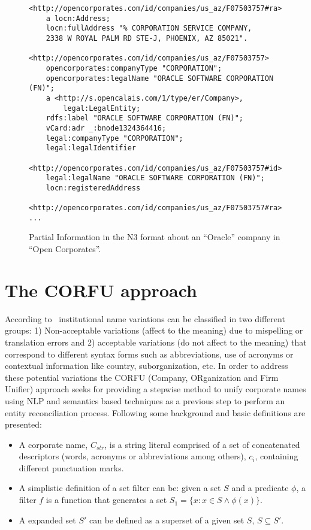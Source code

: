 \documentclass{llncs}
\begin{document}
\begin{itemize}
\begin{figure}[!h]
\begin{center}
\begin{lstlisting}[language=SPARQL]
<http://opencorporates.com/id/companies/us_az/F07503757#ra> 
	a locn:Address;
	locn:fullAddress "% CORPORATION SERVICE COMPANY, 
	2338 W ROYAL PALM RD STE-J, PHOENIX, AZ 85021".

<http://opencorporates.com/id/companies/us_az/F07503757> 
	opencorporates:companyType "CORPORATION";
	opencorporates:legalName "ORACLE SOFTWARE CORPORATION (FN)";
	a <http://s.opencalais.com/1/type/er/Company>,
		legal:LegalEntity;
	rdfs:label "ORACLE SOFTWARE CORPORATION (FN)";
	vCard:adr _:bnode1324364416;
	legal:companyType "CORPORATION";
	legal:legalIdentifier 
	  <http://opencorporates.com/id/companies/us_az/F07503757#id>;
	legal:legalName "ORACLE SOFTWARE CORPORATION (FN)";
	locn:registeredAddress 
	  <http://opencorporates.com/id/companies/us_az/F07503757#ra>.
...
\end{lstlisting}
\caption{Partial Information in the N3 format about an ``Oracle'' company in ``Open Corporates''.}
\label{figure:open}
\end{center}
\end{figure}
 
 
\end{itemize}

% 
 \section{The CORFU approach}
According to~\cite{Galvez2006,Morillo:2013:TAA:2424697.2424727} institutional name variations can be 
classified in two different groups: 1) Non-acceptable variations (affect to the meaning) due to mispelling or translation errors and 
2) acceptable variations (do not affect to the meaning) that correspond to different syntax forms such as abbreviations, use of acronyms or contextual 
information like country, suborganization, etc. In order to address these potential variations the CORFU (Company, ORganization and Firm Unifier) approach 
seeks for providing a stepwise method to unify corporate names using NLP and semantics based techniques as a previous step to perform 
an entity reconciliation process. Following some background and basic definitions are presented: 
\begin{itemize}
 \item A corporate name, $C_{str}$, is a string literal comprised of a set of concatenated descriptors (words, acronyms or abbreviations among others), $c_i$, 
containing different punctuation marks. 
\item A simplistic definition of a set filter can be: given a set $S$ and a predicate $\phi$, a filter $f$ is a function that generates 
a set $S_1 = \{ x : x \in S \wedge \phi (x)\}$.
\item A expanded set $S'$ can be defined as a superset of a given set $S$, $S \subseteq S'$.
\end{itemize}
\end{document}
